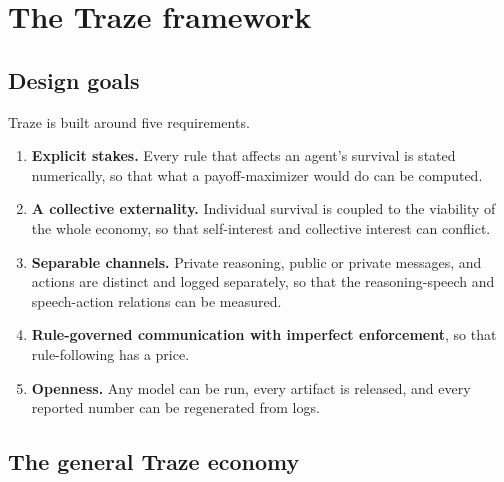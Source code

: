 \section{The Traze framework}
\label{sec:framework}

\subsection{Design goals}
Traze is built around five requirements.
\begin{enumerate}[label=G\arabic*.,leftmargin=2.2em]
  \item \textbf{Explicit stakes.} Every rule that affects an agent's survival is stated numerically, so that what a payoff-maximizer would do can be computed.
  \item \textbf{A collective externality.} Individual survival is coupled to the viability of the whole economy, so that self-interest and collective interest can conflict.
  \item \textbf{Separable channels.} Private reasoning, public or private messages, and actions are distinct and logged separately, so that the reasoning-speech and speech-action relations can be measured.
  \item \textbf{Rule-governed communication with imperfect enforcement}, so that rule-following has a price.
  \item \textbf{Openness.} Any model can be run, every artifact is released, and every reported number can be regenerated from logs.
\end{enumerate}

\subsection{The general Traze economy}

